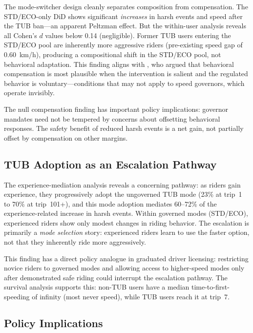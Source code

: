 The mode-switcher design cleanly separates composition from compensation. The STD/ECO-only DiD shows significant \textit{increases} in harsh events and speed after the TUB ban---an apparent Peltzman effect. But the within-user analysis reveals all Cohen's $d$ values below 0.14 (negligible). Former TUB users entering the STD/ECO pool are inherently more aggressive riders (pre-existing speed gap of 0.60~km/h), producing a compositional shift in the STD/ECO pool, not behavioral adaptation. This finding aligns with \citet{hedlund2000risky}, who argued that behavioral compensation is most plausible when the intervention is salient and the regulated behavior is voluntary---conditions that may not apply to speed governors, which operate invisibly.

The null compensation finding has important policy implications: governor mandates need not be tempered by concerns about offsetting behavioral responses. The safety benefit of reduced harsh events is a net gain, not partially offset by compensation on other margins.

\subsection{TUB Adoption as an Escalation Pathway}
\label{sec:disc_escalation}

The experience-mediation analysis reveals a concerning pathway: as riders gain experience, they progressively adopt the ungoverned TUB mode (23\% at trip~1 to 70\% at trip~101+), and this mode adoption mediates 60--72\% of the experience-related increase in harsh events. Within governed modes (STD/ECO), experienced riders show only modest changes in riding behavior. The escalation is primarily a \textit{mode selection} story: experienced riders learn to use the faster option, not that they inherently ride more aggressively.

This finding has a direct policy analogue in graduated driver licensing: restricting novice riders to governed modes and allowing access to higher-speed modes only after demonstrated safe riding could interrupt the escalation pathway. The survival analysis supports this: non-TUB users have a median time-to-first-speeding of infinity (most never speed), while TUB users reach it at trip~7.

\subsection{Policy Implications}
\label{sec:disc_policy}

